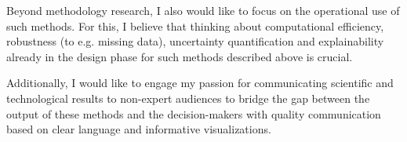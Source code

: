 \documentclass[11pt, a4paper]{awesome-cv}
\begin{document}
\begin{cvletter}
Beyond methodology research, I also would like to focus on the operational use of such methods. For this, I believe that thinking about computational efficiency, robustness (to e.g. missing data), uncertainty quantification and explainability already in the design phase for such methods described above is crucial. %

Additionally, I would like to engage my passion for communicating scientific and technological results to non-expert audiences to bridge the gap between the output of these methods and the decision-makers with quality communication based on clear language and informative visualizations.

\end{cvletter}


\makeletterclosing
\end{document}
